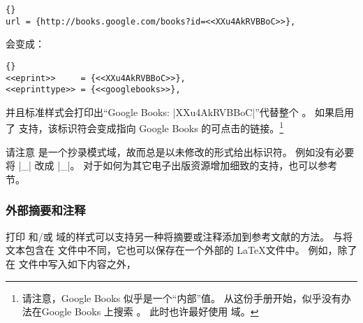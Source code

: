 \begin{lstlisting}[style=bibtex]{}
url = {http://books.google.com/books?id=<<XXu4AkRVBBoC>>},
\end{lstlisting}
%
会变成：

\begin{lstlisting}[style=bibtex]{}
<<eprint>>     = {<<XXu4AkRVBBoC>>},
<<eprinttype>> = {<<googlebooks>>},
\end{lstlisting}
%
并且标准样式会打印出“Google Books: |XXu4AkRVBBoC|”代替整个 。
如果启用了  支持，该标识符会变成指向 Google Books 的可点击的链接。\footnote{ %
	请注意，Google Books  似乎是一个“内部”值。
	从这份手册开始，似乎没有办法在Google Books 上搜索 。
	此时也许最好使用  域。%
}


请注意  是一个抄录模式域，故而总是以未修改的形式给出标识符。
例如没有必要将 |_| 改成 |\_|。
对于如何为其它电子出版资源增加细致的支持，也可以参考  节。

\subsubsection{外部摘要和注释}%
\label{use:use:prf}


打印  和/或   域的样式可以支持另一种将摘要或注释添加到参考文献的方法。
与将文本包含在  文件中不同，它也可以保存在一个外部的 \LaTeX 文件中。
例如，除了在  文件中写入如下内容之外，

